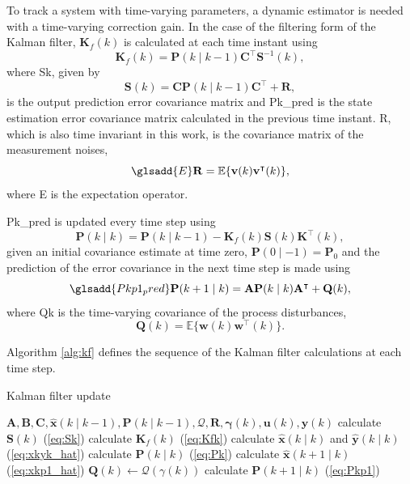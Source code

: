 To track a system with time-varying parameters, a dynamic estimator is needed with a time-varying correction gain. In the case of the filtering form of the Kalman filter, $\mathbf{K}_f(k)$ is calculated at each time instant using
\begin{equation} \label{eq:Kfk}
	\mathbf{K}_f(k) = \mathbf{P}(k \mid k-1)\mathbf{C}^\intercal \mathbf{S}^{-1}(k),
\end{equation}
where \gls{Sk}, given by
\begin{equation} \label{eq:Sk}
	\mathbf{S}(k) = \mathbf{C}\mathbf{P}(k \mid k-1)\mathbf{C}^\intercal + \mathbf{R},
\end{equation}
is the output prediction error covariance matrix and \gls{Pk_pred} is the state estimation error covariance matrix calculated in the previous time instant.  \gls{R}, which is also time invariant in this work, is the covariance matrix of the measurement noises,
\begin{equation} \label{eq:R} \glsadd{E}
	\mathbf{R} = \mathbb{E}\{ \mathbf{v}(k) \mathbf{v}^\intercal(k) \},
\end{equation}
where \gls{E} is the expectation operator.

\gls{Pk_pred} is updated every time step using
\begin{equation} \label{eq:Pk}
	\mathbf{P}(k \mid k) = \mathbf{P}(k \mid k-1) - \mathbf{K}_f(k) \mathbf{S}(k) \mathbf{K}^\intercal(k),
\end{equation}
given an initial covariance estimate at time zero, $\mathbf{P}(0 \mid -1)=\mathbf{P}_0$ and the prediction of the error covariance in the next time step is made using
\begin{equation} \label{eq:Pkp1} \glsadd{Pkp1_pred}
	\mathbf{P}(k+1 \mid k) = \mathbf{A} \mathbf{P}(k \mid k)  \mathbf{A}^\intercal  + \mathbf{Q}(k),
\end{equation}
where \gls{Qk} is the time-varying covariance of the process disturbances,
\begin{equation} \label{eq:Q}
	\mathbf{Q}(k) = \mathbb{E}\{ \mathbf{w}(k) \mathbf{w}^\intercal(k) \}.
\end{equation}

Algorithm \ref{alg:kf} defines the sequence of the Kalman filter calculations at each time step.
\begin{algorithm}
	\caption{Kalman filter update}\label{alg:kf}
	\begin{algorithmic}
		\Require $\mathbf{A},\mathbf{B},\mathbf{C},\mathbf{\hat{x}}(k \mid k-1), \mathbf{P}(k \mid k-1), \mathcal{Q}, \mathbf{R}, \mathbf{\gamma}(k), \mathbf{u}(k), \mathbf{y}(k)$
		\State calculate $\mathbf{S}(k)$ (\ref{eq:Sk})
		\State calculate $\mathbf{K}_f(k)$ (\ref{eq:Kfk})
		\State calculate $\mathbf{\hat{x}}(k \mid k)$ and $\mathbf{\hat{y}}(k \mid k)$ (\ref{eq:xkyk_hat})
		\State calculate $\mathbf{P}(k \mid k)$ (\ref{eq:Pk})
		\State calculate $\mathbf{\hat{x}}(k+1 \mid k)$ (\ref{eq:xkp1_hat})
		\State $\mathbf{Q}(k) \gets \mathcal{Q}(\gamma(k))$
		\State calculate $\mathbf{P}(k+1 \mid k)$ (\ref{eq:Pkp1})
	\end{algorithmic}
\end{algorithm}

